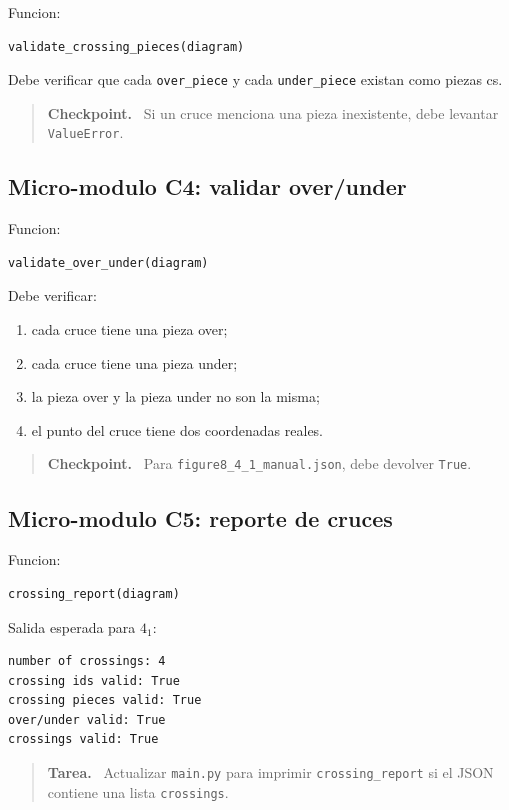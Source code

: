 \documentclass[11pt,letterpaper]{amsart}
\newenvironment{checkpoint}
{\par\medskip\noindent\begin{quote}\textbf{Checkpoint.}\ }
{\end{quote}\par\medskip}
\newenvironment{taskbox}
{\par\medskip\noindent\begin{quote}\textbf{Tarea.}\ }
{\end{quote}\par\medskip}
\begin{document}
Funcion:
\begin{verbatim}
validate_crossing_pieces(diagram)
\end{verbatim}

Debe verificar que cada \texttt{over\_piece} y cada \texttt{under\_piece}
existan como piezas cs.

\begin{checkpoint}
Si un cruce menciona una pieza inexistente, debe levantar \texttt{ValueError}.
\end{checkpoint}

\subsection{Micro-modulo C4: validar over/under}

Funcion:
\begin{verbatim}
validate_over_under(diagram)
\end{verbatim}

Debe verificar:

\begin{enumerate}[label=\textbf{\arabic*.}]
\item cada cruce tiene una pieza over;
\item cada cruce tiene una pieza under;
\item la pieza over y la pieza under no son la misma;
\item el punto del cruce tiene dos coordenadas reales.
\end{enumerate}

\begin{checkpoint}
Para \texttt{figure8\_4\_1\_manual.json}, debe devolver \texttt{True}.
\end{checkpoint}

\subsection{Micro-modulo C5: reporte de cruces}

Funcion:
\begin{verbatim}
crossing_report(diagram)
\end{verbatim}

Salida esperada para \(4_1\):
\begin{verbatim}
number of crossings: 4
crossing ids valid: True
crossing pieces valid: True
over/under valid: True
crossings valid: True
\end{verbatim}

\begin{taskbox}
Actualizar \texttt{main.py} para imprimir \texttt{crossing\_report} si el JSON
contiene una lista \texttt{crossings}.
\end{taskbox}
\end{document}

